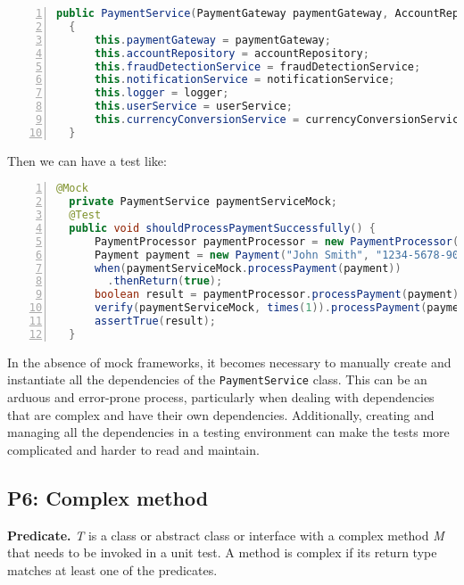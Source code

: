 \documentclass[conference]{IEEEtran}
\begin{document}
\begin{lstlisting}[basicstyle=\ttfamily,
numbers=left,numbersep=0pt,basicstyle=\scriptsize\ttfamily,language = Java, framesep=4.5mm, framexleftmargin=1.0mm, captionpos=b, escapechar=|, morekeywords={@Test}]
  public PaymentService(PaymentGateway paymentGateway, AccountRepository accountRepository, FraudDetectionService fraudDetectionService, NotificationService  notificationService, Logger logger, UserService userService, CurrencyConversionService  currencyConversionService) 
  {
      this.paymentGateway = paymentGateway;
      this.accountRepository = accountRepository;
      this.fraudDetectionService = fraudDetectionService;
      this.notificationService = notificationService;
      this.logger = logger;
      this.userService = userService;
      this.currencyConversionService = currencyConversionService;
  }
\end{lstlisting}
Then we can have a test like:
\begin{lstlisting}[basicstyle=\ttfamily,
numbers=left,numbersep=0pt,basicstyle=\scriptsize\ttfamily,language = Java, framesep=4.5mm, framexleftmargin=1.0mm, captionpos=b, escapechar=|, morekeywords={@Test}]
  @Mock
  private PaymentService paymentServiceMock;
  @Test
  public void shouldProcessPaymentSuccessfully() {
      PaymentProcessor paymentProcessor = new PaymentProcessor(paymentServiceMock);
      Payment payment = new Payment("John Smith", "1234-5678-9012-3456", 100.00);
      when(paymentServiceMock.processPayment(payment))
        .thenReturn(true);
      boolean result = paymentProcessor.processPayment(payment);
      verify(paymentServiceMock, times(1)).processPayment(payment);
      assertTrue(result);
  }
\end{lstlisting}

In the absence of mock frameworks, it becomes necessary to manually create and instantiate all the dependencies of the \texttt{PaymentService} class. This can be an arduous and error-prone process, particularly when dealing with dependencies that are complex and have their own dependencies. Additionally, creating and managing all the dependencies in a testing environment can make the tests more complicated and harder to read and maintain.

\subsection{P6: Complex method}
\textbf{Predicate. }
\textit{T} is a class or abstract class or interface with a complex method \textit{M} that needs to be invoked in a unit test. A method is complex if its return type matches at least one of the predicates.
\end{document}
